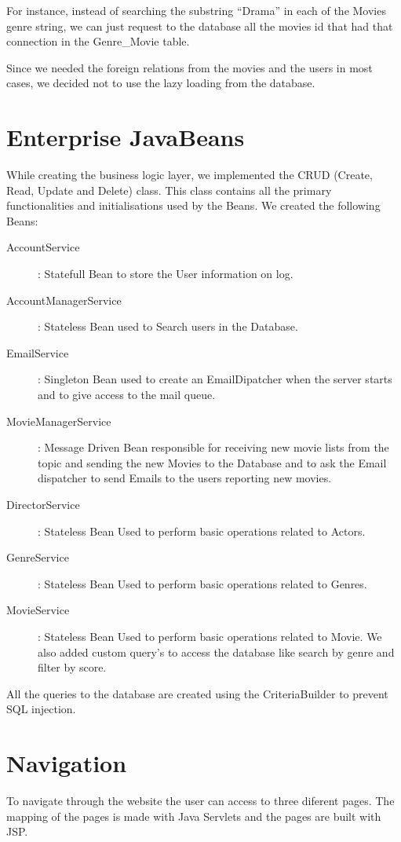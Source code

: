 \documentclass[12pt]{article}
\begin{document}
For instance, instead of searching the substring ``Drama'' in each of the Movies genre string, we can just request to the database all the movies id that had that connection in the Genre\_Movie table.

Since we needed the foreign relations from the movies and the users in most cases, we decided not to use the lazy loading from the database.
\clearpage

\section{Enterprise JavaBeans}
\indent \indent While creating the business logic layer, we implemented the CRUD (Create, Read, Update and Delete) class. This class contains all the primary functionalities and initialisations used by the Beans.
We created the following Beans:
\begin{description}
	\item [AccountService]: Statefull Bean to store the User information on log.

	\item [AccountManagerService]: Stateless Bean used to Search users in the Database.

	\item [EmailService]: Singleton Bean used to create an EmailDipatcher when the server starts and to give access to the mail queue.

	\item [MovieManagerService]: Message Driven Bean responsible for receiving new movie lists from the topic and sending the new Movies to the Database and to ask the Email dispatcher to send Emails to the users reporting new movies.

	\item [DirectorService]: Stateless Bean Used to perform basic operations related to Actors.

	\item [GenreService]: Stateless Bean Used to perform basic operations related to Genres.

	\item [MovieService]: Stateless Bean Used to perform basic operations related to Movie. We also added custom query’s to access the database like search by genre and filter by score.
\end{description}
All the queries to the database are created using the CriteriaBuilder to prevent SQL injection.
\clearpage

\section{Navigation}
\indent \indent To navigate through the website the user can access to three diferent pages. The mapping of the pages is made with Java Servlets and the pages are built with JSP.
\end{document}
